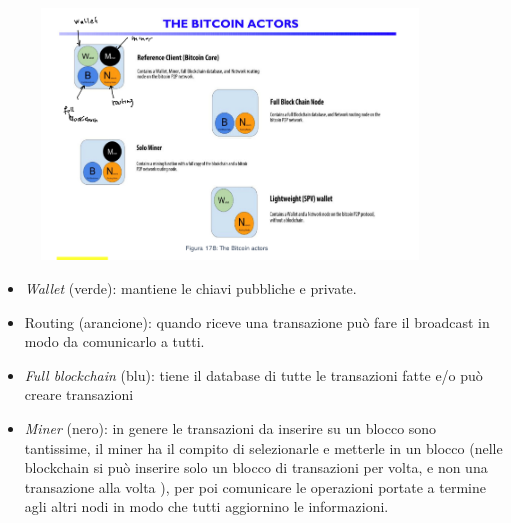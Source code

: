 
\begin{figure}[H]
    \centering
    \includegraphics[width=10cm, keepaspectratio]{capitoli/bitcoin/imgs/bittmp.png}
\end{figure}

\begin{itemize}
    \item \textit{Wallet} (verde): mantiene le chiavi pubbliche e private.
    \item Routing (arancione): quando riceve una transazione può fare il
          broadcast in modo da comunicarlo a tutti.
    \item \textit{Full blockchain} (blu): tiene il database di tutte le transazioni fatte
          e/o può creare transazioni
    \item \textit{Miner} (nero): in genere le transazioni da inserire su un blocco sono
          tantissime, il miner ha il compito di selezionarle e metterle in un
          blocco (nelle blockchain si può inserire solo un blocco di transazioni
          per volta, e non una transazione alla volta ), per poi comunicare le
          operazioni portate a termine agli altri nodi in modo che tutti
          aggiornino le informazioni.
\end{itemize}

